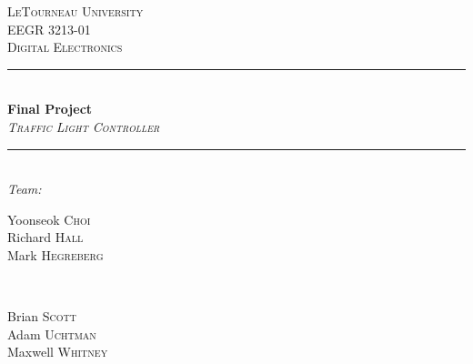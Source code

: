 \begin{titlepage}
\newcommand{\HRule}{\rule{\linewidth}{0.4mm}} %

\center %


\textsc{\LARGE LeTourneau University}\\[1.5cm] %
\textsc{\Large EEGR 3213-01}\\[0.5cm] %
\textsc{\large Digital Electronics}\\[0.5cm] %


\HRule \\[0.4cm]
{\huge \bfseries Final Project}\\[2mm]
{\Large \slshape \scshape Traffic Light Controller} %
\HRule \\[2cm]

\emph{\Large Team:}\\[1cm]
\begin{minipage}{0.35\textwidth}
	\begin{flushleft} \Large
      Yoonseok \textsc{Choi}\\
      Richard \textsc{Hall}\\
      Mark \textsc{Hegreberg}
	\end{flushleft}
\end{minipage}
~
\begin{minipage}{0.35\textwidth}
	\begin{flushright} \Large
		Brian \textsc{Scott}\\
      Adam \textsc{Uchtman}\\
      Maxwell \textsc{Whitney}
	\end{flushright}
\end{minipage}\\[2cm]


\end{titlepage}
